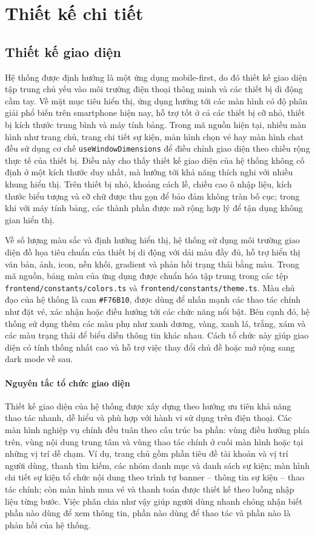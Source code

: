\documentclass[../DoAn.tex]{subfiles}
\begin{document}
\section{Thiết kế chi tiết}
\subsection{Thiết kế giao diện}
Hệ thống được định hướng là một ứng dụng mobile-first, do đó thiết kế giao diện tập trung chủ yếu vào môi trường điện thoại thông minh và các thiết bị di động cầm tay. Về mặt mục tiêu hiển thị, ứng dụng hướng tới các màn hình có độ phân giải phổ biến trên smartphone hiện nay, hỗ trợ tốt ở cả các thiết bị cỡ nhỏ, thiết bị kích thước trung bình và máy tính bảng. Trong mã nguồn hiện tại, nhiều màn hình như trang chủ, trang chi tiết sự kiện, màn hình chọn vé hay màn hình chat đều sử dụng cơ chế \texttt{useWindowDimensions} để điều chỉnh giao diện theo chiều rộng thực tế của thiết bị. Điều này cho thấy thiết kế giao diện của hệ thống không cố định ở một kích thước duy nhất, mà hướng tới khả năng thích nghi với nhiều khung hiển thị. Trên thiết bị nhỏ, khoảng cách lề, chiều cao ô nhập liệu, kích thước biểu tượng và cỡ chữ được thu gọn để bảo đảm không tràn bố cục; trong khi với máy tính bảng, các thành phần được mở rộng hợp lý để tận dụng không gian hiển thị.

Về số lượng màu sắc và định hướng hiển thị, hệ thống sử dụng môi trường giao diện đồ họa tiêu chuẩn của thiết bị di động với dải màu đầy đủ, hỗ trợ hiển thị văn bản, ảnh, icon, nền khối, gradient và phản hồi trạng thái bằng màu. Trong mã nguồn, bảng màu của ứng dụng được chuẩn hóa tập trung trong các tệp \texttt{frontend/constants/colors.ts} và \texttt{frontend/constants/theme.ts}. Màu chủ đạo của hệ thống là cam \texttt{\#F76B10}, được dùng để nhấn mạnh các thao tác chính như đặt vé, xác nhận hoặc điều hướng tới các chức năng nổi bật. Bên cạnh đó, hệ thống sử dụng thêm các màu phụ như xanh dương, vàng, xanh lá, trắng, xám và các màu trạng thái để biểu diễn thông tin khác nhau. Cách tổ chức này giúp giao diện có tính thống nhất cao và hỗ trợ việc thay đổi chủ đề hoặc mở rộng sang dark mode về sau.

\paragraph{Nguyên tắc tổ chức giao diện}\mbox{}

Thiết kế giao diện của hệ thống được xây dựng theo hướng ưu tiên khả năng thao tác nhanh, dễ hiểu và phù hợp với hành vi sử dụng trên điện thoại. Các màn hình nghiệp vụ chính đều tuân theo cấu trúc ba phần: vùng điều hướng phía trên, vùng nội dung trung tâm và vùng thao tác chính ở cuối màn hình hoặc tại những vị trí dễ chạm. Ví dụ, trang chủ gồm phần tiêu đề tài khoản và vị trí người dùng, thanh tìm kiếm, các nhóm danh mục và danh sách sự kiện; màn hình chi tiết sự kiện tổ chức nội dung theo trình tự banner -- thông tin sự kiện -- thao tác chính; còn màn hình mua vé và thanh toán được thiết kế theo luồng nhập liệu từng bước. Việc phân chia như vậy giúp người dùng nhanh chóng nhận biết phần nào dùng để xem thông tin, phần nào dùng để thao tác và phần nào là phản hồi của hệ thống.
\end{document}
